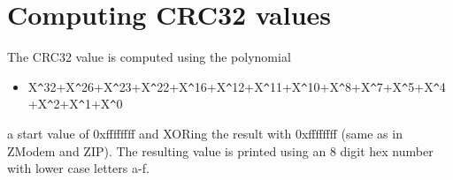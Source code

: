 \documentclass{article}
\begin{document}
\section{Computing CRC32 values }



The CRC32 value is computed using the polynomial  
\begin{itemize}
\item X\verb+^+32+X\verb+^+26+X\verb+^+23+X\verb+^+22+X\verb+^+16+X\verb+^+12+X\verb+^+11+X\verb+^+10+X\verb+^+8+X\verb+^+7+X\verb+^+5+X\verb+^+4+X\verb+^+2+X\verb+^+1+X\verb+^+0
\end{itemize}


a start value of 0xffffffff and XORing the result with 0xffffffff (same as in ZModem and ZIP). The resulting value is printed using an 8 digit hex number with lower case letters a-f. 
\end{document}
